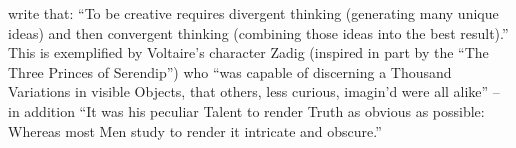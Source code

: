  write that: ``To be creative requires
divergent thinking (generating many unique ideas) and then convergent
thinking (combining those ideas into the best result).''  This is
exemplified by Voltaire's \citeyear{zadig} character Zadig (inspired
in part by the ``The Three Princes of Serendip'') who ``was capable of
discerning a Thousand Variations in visible Objects, that others, less
curious, imagin’d were all alike'' -- in addition ``It was his
peculiar Talent to render Truth as obvious as possible: Whereas most
Men study to render it intricate and obscure.''
